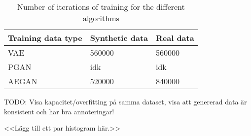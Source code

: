 \begin{table}[t]
    \centering
    \caption{Number of iterations of training for the different algorithms}
    \label{tab:quantitative_results}
    \begin{tabular}{l|l|l}
    \hline
    Training data type      & Synthetic data  & Real data \\ \hline
    VAE                     & 560000 & 560000 \\
    PGAN                    & idk & idk     \\
    AEGAN                   & 520000 & 840000   \\
    \end{tabular}
\end{table}

TODO: Visa kapacitet/overfitting på samma dataset, visa att genererad data är konsistent och har bra annoteringar!

<<Lägg till ett par histogram här.>>
